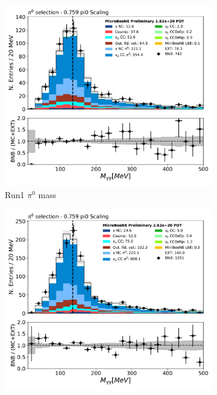 \documentclass[a4paper]{article}
\begin{document}
\begin{figure}[H] 
\begin{center}
    \begin{subfigure}[b]{0.3\textwidth}
    \centering
    \includegraphics[width=1.00\textwidth]{stability/pi0_mass_Y_corrpi0_mass_Y_corr_run1.pdf}
    \caption{\label{fig:stability:pi0mass:R1} Run1 $\pi^0$ mass}
    \end{subfigure}
    \begin{subfigure}[b]{0.3\textwidth}
    \centering
    \includegraphics[width=1.00\textwidth]{stability/pi0_mass_Y_corrpi0_mass_Y_corr_run2.pdf}

\end{subfigure}
\end{center}
\end{figure}
\end{document}
